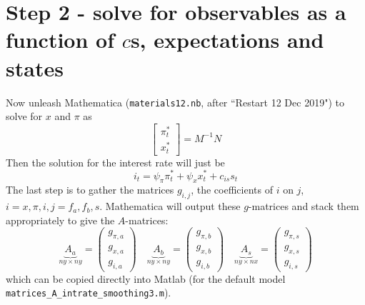 \documentclass[11pt]{article}
\renewcommand{\[}{\begin{equation}}
\renewcommand{\]}{\end{equation}}
\begin{document}
\section{Step 2 - solve for observables as a function of $c$s, expectations and states}
Now unleash Mathematica (\texttt{materials12.nb}, after ``Restart 12 Dec 2019") to solve for $x$ and $\pi$ as \begin{equation}
\begin{bmatrix} \pi_t^* \\ x_t^* \end{bmatrix} = M^{-1}N
\end{equation}
Then the solution for the interest rate will just be
\begin{equation}
i_t = \psi_{\pi}\pi_t^* + \psi_{x} x_t^*  +c_{is} s_t
\end{equation}
The last step is to gather the matrices $g_{i,j}$, the coefficients of $i$ on $j$, $i=x,\pi,i, j=f_a,f_b,s$. Mathematica will output these $g$-matrices and stack them appropriately to give the $A$-matrices:
\begin{equation}
\underbrace{A_a}_{ny \times ny} = \begin{pmatrix} g_{\pi,a} \\ g_{x,a} \\ g_{i,a}\end{pmatrix} \quad 
\underbrace{A_b}_{ny \times ny} = \begin{pmatrix} g_{\pi,b} \\ g_{x,b} \\ g_{i,b}\end{pmatrix} \quad 
\underbrace{A_s}_{ny \times nx} = \begin{pmatrix} g_{\pi,s} \\ g_{x,s} \\ g_{i,s}\end{pmatrix}
\end{equation}
which can be copied directly into Matlab (for the default model \texttt{matrices\_A\_intrate\_smoothing3.m}).
\end{document}
